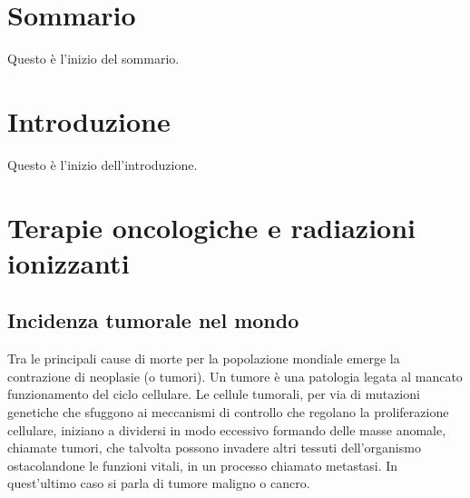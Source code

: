 \documentclass[12pt,a4paper,twoside]{report}
\begin{document}
	\chapter*{Sommario}
		Questo è l'inizio del sommario.
	\newpage
	\tableofcontents
	\newpage
	\chapter*{Introduzione}
		Questo è l'inizio dell'introduzione.
	\newpage
	
	\chapter{Terapie oncologiche e radiazioni ionizzanti}
	\section{Incidenza tumorale nel mondo}
	Tra le principali cause di morte per la popolazione mondiale emerge la contrazione di neoplasie (o tumori). Un tumore è una patologia legata al mancato funzionamento del ciclo cellulare. Le cellule tumorali, per via di mutazioni genetiche che sfuggono ai meccanismi di controllo che regolano la proliferazione cellulare, iniziano a dividersi in modo eccessivo formando delle masse anomale, chiamate tumori, che talvolta possono invadere altri tessuti dell'organismo ostacolandone le funzioni vitali, in un processo chiamato metastasi. In quest'ultimo caso si parla di tumore maligno o cancro.
		
\end{document}
